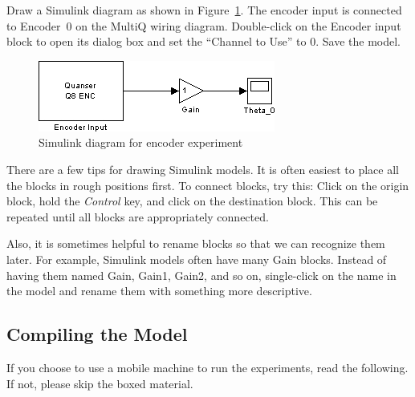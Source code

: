 Draw a Simulink diagram as shown in Figure~\ref{fig.encodermeasure}.  The encoder input is connected to Encoder~0 on the MultiQ wiring diagram.  Double-click on the Encoder input block to open its dialog box and set the ``Channel to Use'' to 0.  Save the model.

\begin{figure}[bht]
\centering
\includegraphics[width=.5\textwidth]{encoderonly}
\caption{\footnotesize
        Simulink diagram for encoder experiment
        \label{fig.encodermeasure}
        }
\end{figure}

There are a few tips for drawing Simulink models.  It is often easiest to place all the blocks in rough positions first.  To connect blocks, try this: Click on the origin block, hold the \textit{Control} key, and click on the destination block.  This can be repeated until all blocks are appropriately connected.
\par
Also, it is sometimes helpful to rename blocks so that we can recognize them later.  For example, Simulink models often have many Gain blocks.  Instead of having them named Gain, Gain1, Gain2, and so on, single-click on the name in the model and rename them with something more descriptive.

\subsection{Compiling the Model}
If you choose to use a mobile machine to run the experiments, read the following.  If not, please skip the boxed material.
\par \noindent
\begin{center} \setlength{\fboxrule}{0.5pt}
\end{center}

